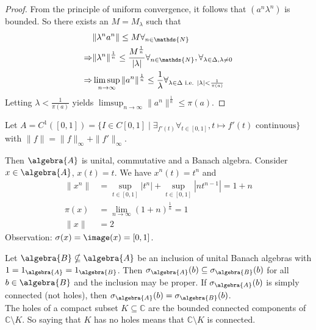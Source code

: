 \documentclass[a4paper]{article}
\begin{document}
\begin{proof}
	From the principle of uniform convergence, it follows that $(a^n \lambda^n)$ is bounded. So there exists an $M = M_\lambda$ such that
	\begin{align*}
		      & \|\lambda^n a^n\| \leq M \forall_{n \in \mathds{N}}                                                                                           \\
		\then & \| \lambda^n \|^{\frac{1}{n}} \leq \frac{M^{\frac{1}{n}}}{|\lambda|} \forall_{n \in \mathds{N}}, \forall_{\lambda \in \Delta, \lambda \neq 0} \\
		\then & \limsup_{n \to \infty} \|a^n\|^{\frac{1}{n}} \leq \frac{1}{\lambda} \forall_{\lambda \in \Delta \text{ i.e. } |\lambda| < \frac{1}{\pi(a)}}
	\end{align*}
	Letting $\lambda < \frac{1}{\pi(a)}$ yields $\limsup_{n \to \infty} \|a^n\|^{\frac{1}{n}} \leq \pi(a)$.
\end{proof}

\begin{example}
	Let $A = C^1([0,1]) = \{ I \in C[0,1] \mid \exists_{f'(t)} \forall_{t \in [0,1]}, t \mapsto f'(t) \text{ continuous} \}$ with $\|f\| = \|f\|_\infty + \|f'\|_\infty$.

	Then $\algebra{A}$ is unital, commutative and a Banach algebra. Consider $x \in \algebra{A}$, $x(t) = t$. We have $x^n(t) = t^n$ and
	\begin{align*}
		\|x^n\| & = \sup_{t \in [0,1]} |t^n| + \sup_{t \in [0,1]} |n t^{n-1}| = 1 + n \\
		\pi(x)  & = \lim_{n \to \infty} (1+n)^\frac{1}{n} = 1                         \\
		\| x \| & = 2
	\end{align*}
	Observation: $\sigma(x) = \image(x) = [0,1]$.
\end{example}

\begin{theorem}
	Let $\algebra{B} \nsubseteq \algebra{A}$ be an inclusion of unital Banach algebras with $1 = 1_\algebra{A} = 1_\algebra{B}$. Then $\sigma_\algebra{A}(b) \subseteq \sigma_\algebra{B}(b)$ for all $b \in \algebra{B}$ and the inclusion may be proper. If $\sigma_\algebra{A}(b)$ is simply connected (not holes), then $\sigma_\algebra{A}(b) = \sigma_\algebra{B}(b)$.\\
	The holes of a compact subset $K \subseteq \mathds{C}$ are the bounded connected components of $\mathds{C} \setminus K$. So saying that $K$ has no holes means that $\mathds{C} \setminus K$ is connected.
\end{theorem}
\end{document}
